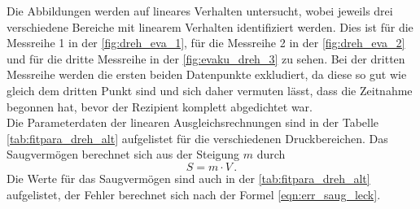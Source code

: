     \noindent Die Abbildungen werden auf lineares Verhalten untersucht, wobei jeweils drei verschiedene Bereiche mit linearem Verhalten identifiziert werden. 
    Dies ist für die Messreihe 1 in der \autoref{fig:dreh_eva_1}, für die Messreihe 2 in der \autoref{fig:dreh_eva_2} und für die dritte Messreihe in der 
    \autoref{fig:evaku_dreh_3} zu sehen. Bei der dritten Messreihe werden die ersten beiden Datenpunkte exkludiert, da diese so gut wie gleich dem dritten Punkt sind und sich 
    daher vermuten lässt, dass die Zeitnahme begonnen hat, bevor der Rezipient komplett abgedichtet war.\\ 
    Die Parameterdaten der linearen Ausgleichsrechnungen sind in der Tabelle \autoref{tab:fitpara_dreh_alt} aufgelistet für die verschiedenen Druckbereichen. Das Saugvermögen berechnet sich 
    aus der Steigung $m$ durch 
    \begin{equation*}
      S = m \cdot V\, .
    \end{equation*}
    Die Werte für das Saugvermögen sind auch in der \autoref{tab:fitpara_dreh_alt} aufgelistet, der Fehler berechnet sich nach der Formel \eqref{eqn:err_saug_leck}. 

